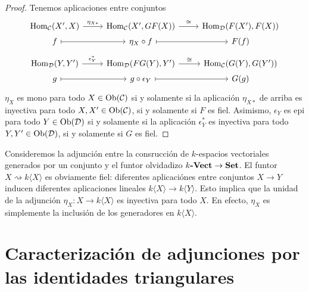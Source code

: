 \documentclass{article}
\numberwithin{equation}{section}
\theoremstyle{definition}
\begin{document}
\begin{proposicion}
\begin{proof}
    Tenemos aplicaciones entre conjuntos
    \[ \begin{tikzcd}[row sep=0.1em]
        \Hom_\vcateg{C} (X', X) \ar{r}{\eta_{X*}} & \Hom_\vcateg{C} (X', GF (X)) \ar{r}{\isom} & \Hom_\vcateg{D} (F (X'), F (X)) \\
        f \ar[|->]{r} & \eta_X\circ f \ar[|->]{r} & F (f) \\
        ~ & ~ & ~ \\
        \Hom_\vcateg{D} (Y, Y') \ar{r}{\epsilon_Y^*} & \Hom_\vcateg{D} (FG (Y), Y') \ar{r}{\isom} & \Hom_\vcateg{C} (G (Y), G (Y')) \\
        g \ar[|->]{r} & g\circ \epsilon_Y \ar[|->]{r} & G (g)
      \end{tikzcd} \]
    $\eta_X$ es mono para todo $X\in \operatorname{Ob} (\mathcal{C})$ si y solamente si la
    aplicación $\eta_{X*}$ de arriba es inyectiva para todo
    $X,X'\in \operatorname{Ob} (\mathcal{C})$, si y solamente si $F$ es fiel. Asimismo,
    $\epsilon_Y$ es epi para todo $Y\in \operatorname{Ob} (\mathcal{D})$ si y solamente si la
    aplicación $\epsilon_Y^*$ es inyectiva para todo $Y,Y'\in \operatorname{Ob} (\mathcal{D})$,
    si y solamente si $G$ es fiel.
  \end{proof}
\end{proposicion}

\begin{ejemplo}
  Consideremos la adjunción entre la consrucción de $k$-espacios vectoriales
  generados por un conjunto y el funtor olvidadizo
  $k\text{\bf -Vect} \to \text{\bf Set}$. El funtor
  $X \rightsquigarrow k \langle X\rangle$ es obviamente fiel: diferentes
  aplicaciónes entre conjuntos $X\to Y$ inducen diferentes aplicaciones lineales
  $k\langle X\rangle \to k\langle Y\rangle$. Esto implica que la unidad de la
  adjunción $\eta_X\colon X\to k\langle X\rangle$ es inyectiva para todo $X$.
  En efecto, $\eta_X$ es simplemente la inclusión de los generadores en
  $k\langle X\rangle$.
\end{ejemplo}


\section{Caracterización de adjunciones por las identidades triangulares}
\end{document}
